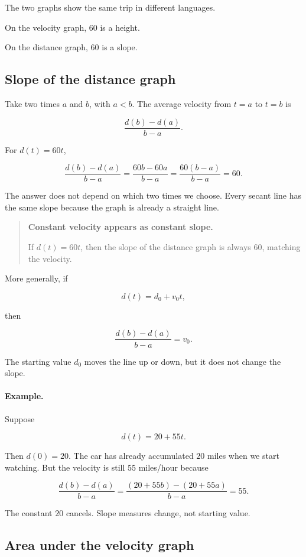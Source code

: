 The two graphs show the same trip in different languages.

On the velocity graph, \(60\) is a height.

On the distance graph, \(60\) is a slope.

\subsection{Slope of the distance graph}

Take two times \(a\) and \(b\), with \(a<b\). The average velocity from \(t=a\) to \(t=b\) is

\[
\frac{d(b)-d(a)}{b-a}.
\]

For \(d(t)=60t\),

\[
\frac{d(b)-d(a)}{b-a}
=
\frac{60b-60a}{b-a}
=
\frac{60(b-a)}{b-a}
=
60.
\]

The answer does not depend on which two times we choose. Every secant line has the same slope because the graph is already a straight line.

\begin{quote}
\textbf{Constant velocity appears as constant slope.}

If \(d(t)=60t\), then the slope of the distance graph is always \(60\), matching the velocity.
\end{quote}

More generally, if

\[
d(t)=d_0+v_0t,
\]

then

\[
\frac{d(b)-d(a)}{b-a}
=
v_0.
\]

The starting value \(d_0\) moves the line up or down, but it does not change the slope.

\paragraph{Example.}
Suppose

\[
d(t)=20+55t.
\]

Then \(d(0)=20\). The car has already accumulated \(20\) miles when we start watching. But the velocity is still \(55\) miles/hour because

\[
\frac{d(b)-d(a)}{b-a}
=
\frac{(20+55b)-(20+55a)}{b-a}
=
55.
\]

The constant \(20\) cancels. Slope measures change, not starting value.

\subsection{Area under the velocity graph}

